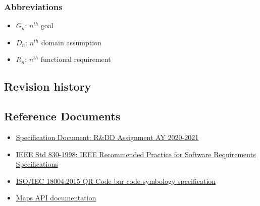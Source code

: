 \subsubsection{Abbreviations}
\begin{itemize}
    \item \textbf{$G_n$}: $n^{th}$ goal
    \item \textbf{$D_n$}: $n^{th}$ domain assumption
    \item \textbf{$R_n$}: $n^{th}$ functional requirement
\end{itemize}
\subsection{Revision history}


\subsection{Reference Documents}
\begin{itemize}
    \item \href{https://beep.metid.polimi.it/documents/121843524/23d1869d-ab17-4e36-979e-f1ccbc59be24}{Specification Document: R\&DD Assignment AY 2020-2021}
    \item \href{https://standards.ieee.org/standard/29148-2011.html}{IEEE Std 830-1998: IEEE Recommended Practice for Software Requirements Specifications}
    \item \href{https://www.iso.org/standard/62021.html}{ISO/IEC 18004:2015 QR Code bar code symbology specification}
    \item \href{https://developers.google.com/maps/documentation/javascript/overview}{Maps API documentation}
\end{itemize}


